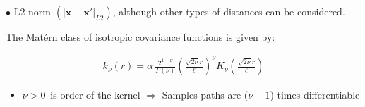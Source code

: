 \documentclass[8pt]{beamer} %
\begin{document}
\begin{frame}
\begin{adjustwidth}{-2.5em}{-0.5em}
\begin{itemize}
\begin{itemize}
	\vspace{1mm}
	\hspace{20mm} \tiny$\bullet$ \scriptsize  {\color{navyblue} L2-norm $(|\bm{x}-\bm{x}'|_{L2})$}, although other types of distances can be considered.
	\end{itemize}
\end{itemize}
\end{adjustwidth}
\end{frame}

\begin{frame}

The {\color{navyblue} Mat\'ern class} of isotropic covariance functions is given by:
 
\vspace{-5mm}
\begin{align*}
k_{\nu}(r)=\alpha \, \frac{2^{1-\nu}}{\Gamma(\nu)}\left(\frac{\sqrt{2\nu}r}{\ell}\right)^{\!\nu} \! K_{\nu} \left(\frac{\sqrt{2\nu}r}{\ell}\right)
\end{align*}

\vspace{-2mm}
\begin{itemize}\setlength\itemsep{1mm}
\item<1->$\nu > 0$\, is order of the kernel\; $\Rightarrow$\; {\color{navyblue} Samples paths are ($\nu-1$) times differentiable}\\[2mm]
\end{itemize}


\end{frame}
\end{document}
